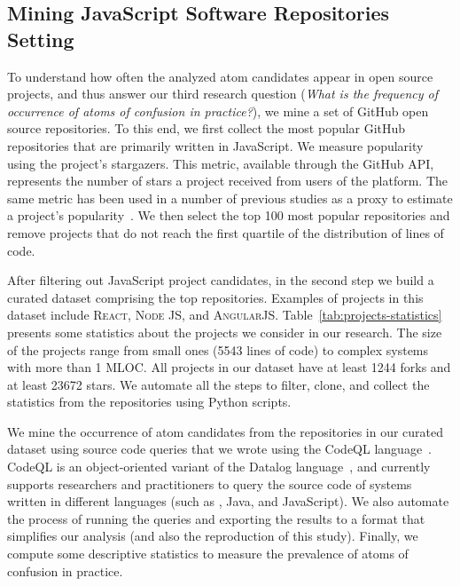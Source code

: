 \subsection{Mining JavaScript Software Repositories Setting}

To understand how often the analyzed atom candidates appear in open source projects, and thus answer our third research question (\emph{What is the frequency of occurrence of atoms of confusion in practice?}), we mine a set of GitHub open source repositories. To this end, we first collect the most popular GitHub repositories that are primarily written in JavaScript. We measure popularity using the project's stargazers. This metric, available through the GitHub API, represents the number of stars a project received from users of the platform. The same metric has been used in a number of previous studies as a proxy to estimate a project's popularity~\cite{gyimesi2019bugsjs,canedo:esem2020}. We then select the top 100 most popular repositories and remove projects that do not reach the first quartile of the distribution of lines of code.

After filtering out JavaScript project candidates, in the second step we build a curated dataset comprising the top \minedprojects repositories. Examples of projects in this dataset include \textsc{React}, \textsc{Node JS}, and \textsc{AngularJS}. Table~\ref{tab:projects-statistics} presents some statistics about the projects we consider in our research. The size of the projects range from small ones (5543 lines of code) to complex systems with more than 1 MLOC. All projects in our dataset have at least \num{1244} forks and at least \num{23672} stars. We automate all the steps to filter, clone, and collect the statistics from the repositories using Python scripts.

We mine the occurrence of atom candidates from the repositories in our curated dataset using source code queries that we wrote using the CodeQL language~\cite{moor:gttse2007}. CodeQL is an object-oriented variant of the Datalog language~\cite{rodriguez2020efficient}, and currently supports researchers and practitioners to query the source code of systems written in different languages (such as \cpplang, Java, and JavaScript). We also automate the process of running the queries and exporting the results to a format that simplifies our analysis (and also the reproduction of this study). Finally, we compute some descriptive statistics to measure the prevalence of atoms of confusion in practice. 

